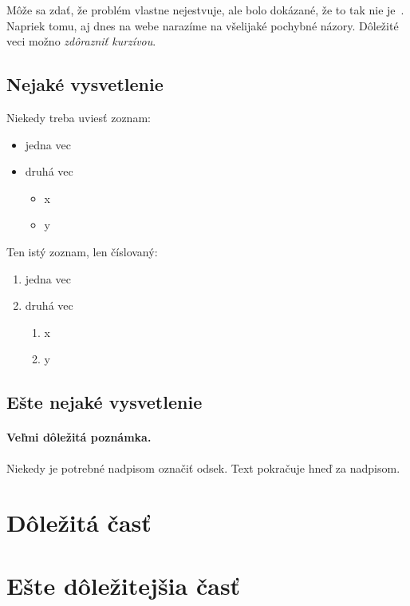 \documentclass[10pt,twoside,slovak,a4paper]{article}
\begin{document}
Môže sa zdať, že problém vlastne nejestvuje\cite{Coplien:MPD}, ale bolo dokázané, že to tak nie je~\cite{Czarnecki:Staged, Czarnecki:Progress}. Napriek tomu, aj dnes na webe narazíme na všelijaké pochybné názory\cite{PLP-Framework}. Dôležité veci možno \emph{zdôrazniť kurzívou}.


\subsection{Nejaké vysvetlenie} \label{ina:nejake}

Niekedy treba uviesť zoznam:

\begin{itemize}
\item jedna vec
\item druhá vec
	\begin{itemize}
	\item x
	\item y
	\end{itemize}
\end{itemize}

Ten istý zoznam, len číslovaný:

\begin{enumerate}
\item jedna vec
\item druhá vec
	\begin{enumerate}
	\item x
	\item y
	\end{enumerate}
\end{enumerate}


\subsection{Ešte nejaké vysvetlenie} \label{ina:este}

\paragraph{Veľmi dôležitá poznámka.}
Niekedy je potrebné nadpisom označiť odsek. Text pokračuje hneď za nadpisom.



\section{Dôležitá časť} \label{dolezita}




\section{Ešte dôležitejšia časť} \label{dolezitejsia}
\end{document}
